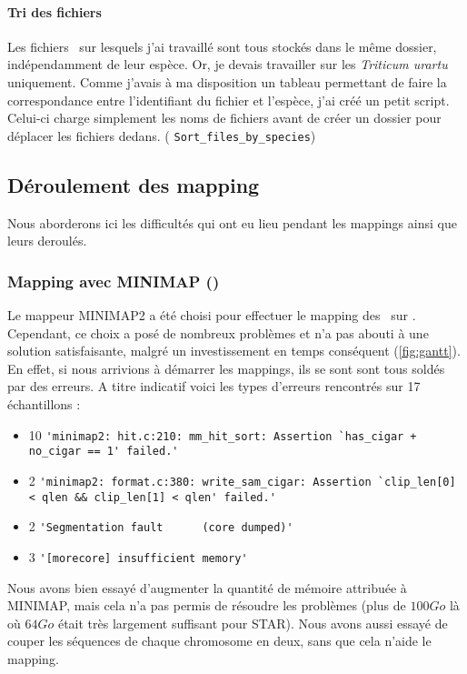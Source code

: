 \documentclass[../main]{subfiles} %
\begin{document}
\paragraph{Tri des fichiers}
Les fichiers \fastq sur lesquels  j’ai travaillé sont tous stockés dans le même dossier, indépendamment de leur espèce. Or, je devais travailler sur les \textit{Triticum urartu} uniquement. Comme j’avais à ma disposition un tableau permettant de faire la correspondance entre l’identifiant du fichier et l’espèce, j’ai créé un petit script. Celui-ci charge simplement les noms de fichiers avant de créer un dossier pour déplacer les fichiers dedans. (\cite{florent_f-marchalm1bioinfointernship2024-inrae_agap_ge2pop_2024} \lstinline{Sort_files_by_species})


\subsection{Déroulement des \gls{mapping}}

Nous aborderons ici les difficultés qui ont eu lieu pendant les mappings ainsi que leurs deroulés.
\subsubsection{Mapping avec \gls{MINIMAP} (\GeMo)}
\label{sec:Minimap}
Le \gls{mappeur} MINIMAP2 a été choisi pour effectuer le \gls{mapping} des \fastq sur \GeMo. Cependant, ce choix a posé de nombreux problèmes et n'a pas abouti à une solution satisfaisante, malgré un investissement en temps conséquent (\cref{fig:gantt}). En effet, si nous arrivions à démarrer les \glspl{mapping}, ils se sont sont tous soldés par des erreurs. A titre indicatif voici les types d’erreurs rencontrés sur 17 échantillons :

\begin{itemize}
    \item  10 \lstinline{'minimap2: hit.c:210: mm_hit_sort: Assertion `has_cigar + no_cigar == 1' failed.'}
    \item 2 \lstinline{'minimap2: format.c:380: write_sam_cigar: Assertion `clip_len[0] < qlen && clip_len[1] < qlen' failed.'}
    \item 2 \lstinline{'Segmentation fault      (core dumped)'}
    \item 3 \lstinline{'[morecore] insufficient memory'}
\end{itemize}

Nous avons bien essayé d’augmenter la quantité de mémoire attribuée à \gls{MINIMAP}, mais cela n’a pas permis de résoudre les problèmes (plus de $\num{100} Go$ là où $\num{64} Go$ était très largement suffisant pour \gls{STAR}). Nous avons aussi essayé de couper les séquences de chaque chromosome en deux, sans que cela n'aide le \gls{mapping}. 
\end{document}
